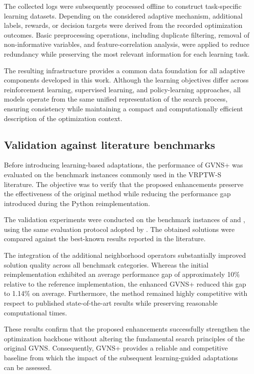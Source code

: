 The collected logs were subsequently processed offline to construct task-specific learning datasets. Depending on the considered adaptive mechanism, additional labels, rewards, or decision targets were derived from the recorded optimization outcomes. Basic preprocessing operations, including duplicate filtering, removal of non-informative variables, and feature-correlation analysis, were applied to reduce redundancy while preserving the most relevant information for each learning task.

The resulting infrastructure provides a common data foundation for all adaptive components developed in this work. Although the learning objectives differ across reinforcement learning, supervised learning, and policy-learning approaches, all models operate from the same unified representation of the search process, ensuring consistency while maintaining a compact and computationally efficient description of the optimization context.
\subsection{Validation against literature benchmarks}
Before introducing learning-based adaptations, the performance of GVNS+ was evaluated on the benchmark instances commonly used in the VRPTW-S literature. The objective was to verify that the proposed enhancements preserve the effectiveness of the original method while reducing the performance gap introduced during the Python reimplementation.

The validation experiments were conducted on the benchmark instances of \citet{bredstrom2008combined} and \citet{liu2019adaptive}, using the same evaluation protocol adopted by \citet{masmoudi2025generalized}. The obtained solutions were compared against the best-known results reported in the literature.

The integration of the additional neighborhood operators substantially improved solution quality across all benchmark categories. Whereas the initial reimplementation exhibited an average performance gap of approximately 10\% relative to the reference implementation, the enhanced GVNS+ reduced this gap to 1.14\% on average. Furthermore, the method remained highly competitive with respect to published state-of-the-art results while preserving reasonable computational times.

These results confirm that the proposed enhancements successfully strengthen the optimization backbone without altering the fundamental search principles of the original GVNS. Consequently, GVNS+ provides a reliable and competitive baseline from which the impact of the subsequent learning-guided adaptations can be assessed.
